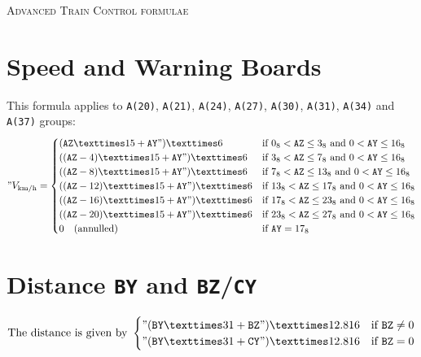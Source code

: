 \documentclass[usenames,dvipsnames]{scrartcl}
\begin{document}
  {\Huge\scshape Advanced Train Control formulae}

  \section{Speed and Warning Boards}

  This formula applies to \texttt{A(20)}, \texttt{A(21)}, \texttt{A(24)}, \texttt{A(27)}, \texttt{A(30)}, \texttt{A(31)}, \texttt{A(34)} and \texttt{A(37)} groups:
  \begin{equation*}
    "V_{\mathrm{km/h}} = \begin{cases}
      (\mathtt{AZ} × 15 + \mathtt{AY}") × 6  & \text{if \(0_8 < \mathtt{AZ} \leq 3_8\) and \(0 < \mathtt{AY} \leq 16_8\)}\\
      ((\mathtt{AZ} - 4) × 15 + \mathtt{AY}") × 6   & \text{if \(3_8 < \mathtt{AZ} \leq 7_8\) and \(0 < \mathtt{AY} \leq 16_8\)}\\
      ((\mathtt{AZ} - 8) × 15 + \mathtt{AY}") × 6   & \text{if \(7_8 < \mathtt{AZ} \leq 13_8\) and \(0 < \mathtt{AY} \leq 16_8\)}\\
      ((\mathtt{AZ} - 12) × 15 + \mathtt{AY}") × 6  & \text{if \(13_8 < \mathtt{AZ} \leq 17_8\) and \(0 < \mathtt{AY} \leq 16_8\)}\\
      ((\mathtt{AZ} - 16) × 15 + \mathtt{AY}") × 6  & \text{if \(17_8 < \mathtt{AZ} \leq 23_8\) and \(0 < \mathtt{AY} \leq 16_8\)}\\
      ((\mathtt{AZ} - 20) × 15 + \mathtt{AY}") × 6  & \text{if \(23_8 < \mathtt{AZ} \leq 27_8\) and \(0 < \mathtt{AY} \leq 16_8\)}\\
      0 \quad\text{(annulled)} & \text{if \(\mathtt{AY} = 17_8\)}
    \end{cases}
  \end{equation*}

  \section{Distance \texttt{BY} and \texttt{BZ}/\texttt{CY}}

  \begin{equation*}
    \text{The distance is given by }
    \begin{cases}
      "(\mathtt{BY} × 31 + \mathtt{BZ}") × 12.816 & \text{if \(\texttt{BZ} \neq 0\)}\\
      "(\mathtt{BY} × 31 + \mathtt{CY}") × 12.816 & \text{if \(\texttt{BZ} = 0\)}
    \end{cases}
  \end{equation*}
\end{document}
